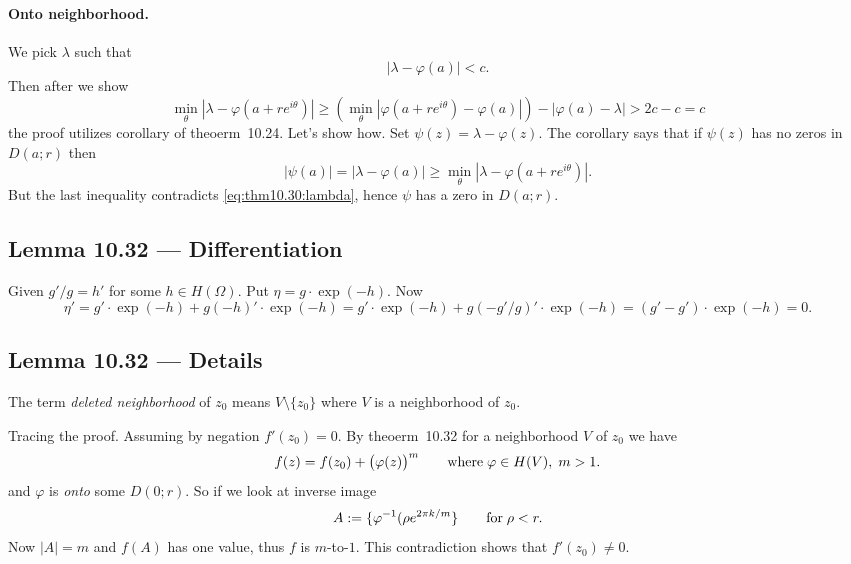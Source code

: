 \paragraph{Onto neighborhood.}
We pick \(\lambda\) such that
\begin{equation} \label{eq:thm10.30:lambda}
|\lambda - \varphi(a)| < c.
\end{equation}
Then after we show
\begin{equation*}
\min_\theta \left| \lambda - \varphi(a + re^{i\theta})\right|
\geq
  \left(\min_\theta \left| \varphi(a + re^{i\theta}) - \varphi(a)\right|\right)
  - |\varphi(a) - \lambda|
> 2c - c = c
\end{equation*}
the proof utilizes corollary of theoerm~10.24. Let's show how.
Set \(\psi(z) = \lambda - \varphi(z)\).
The corollary says that if
\(\psi(z)\) has no zeros in \(D(a;r)\) then
\begin{equation*}
|\psi(a)| = |\lambda - \varphi(a)|
\geq \min_\theta \left| \lambda - \varphi(a + re^{i\theta})\right|.
\end{equation*}
But the last inequality contradicts \eqref{eq:thm10.30:lambda}, hence
\(\psi\) has a zero in \(D(a;r)\).


\subsection{Lemma 10.32 --- Differentiation}

Given \(g'/g = h'\) for some \(h\in H(\Omega)\).
Put \(\eta = g\cdot\exp(-h)\). Now
\begin{equation*}
\eta'
= g'\cdot\exp(-h) + g(-h)'\cdot\exp(-h)
= g'\cdot\exp(-h) + g(-g'/g)'\cdot\exp(-h)
= (g'-g')\cdot\exp(-h)
= 0.
\end{equation*}

\subsection{Lemma 10.32 --- Details}

The term
\emph{deleted neighborhood} of \(z_0\) means \(V\setminus\{z_0\}\)
where $V$ is a neighborhood of \(z_0\).

Tracing the proof. Assuming by negation \(f'(z_0) = 0\).
By theoerm~10.32 for a neighborhood $V$ of \(z_0\) we have
\begin{equation*}
f(z) = f(z_0) + \bigl(\varphi(z)\bigr)^m
\qquad \textnormal{where}\;\varphi\in H(V),\; m > 1.
\end{equation*}
and \(\varphi\) is \emph{onto} some \(D(0;r)\).
So if we look at inverse image
\begin{equation*}
A := \{\varphi^{-1}(\rho e^{2\pi k/m}\} \qquad \textnormal{for}\; \rho < r.
\end{equation*}
Now \(|A|=m\) and \(f(A)\) has one value, thus $f$ is $m$-to-$1$.
This contradiction shows that \(f'(z_0) \neq 0\).

